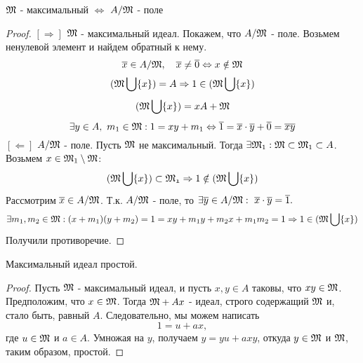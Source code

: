 \begin{thm}
$\mathfrak{M}$ - максимальный $\Leftrightarrow$ $A/\mathfrak{M}$ - поле
\end{thm}
\begin{proof}
$[\Rightarrow]$ $\mathfrak{M}$ - максимальный идеал. Покажем, что $A/\mathfrak{M}$ - поле. Возьмем ненулевой элемент и найдем обратный
к нему.
\[\overline{x} \in A/\mathfrak{M},~~~\overline{x} \neq \overline{0} \Leftrightarrow x \notin \mathfrak{M}\]
\[(\mathfrak{M}\bigcup\{x\}) = A \Rightarrow 1 \in (\mathfrak{M}\bigcup\{x\})\]
\[(\mathfrak{M}\bigcup\{x\}) = xA + \mathfrak{M}\]
\[\exists y \in A, ~ m_1 \in \mathfrak{M}: 1 = xy + m_1 \Leftrightarrow \overline{1} = \overline{x}\cdot\overline{y} + \overline{0}
 = \overline{xy}
\]
$[\Leftarrow]$ $A/\mathfrak{M}$ - поле. Пусть $\mathfrak{M}$ не максимальный. Тогда $\exists \mathfrak{M}_1: \mathfrak{M} \subset \mathfrak{M}_1
\subset A$. Возьмем $x \in \mathfrak{M}_1\setminus\mathfrak{M}$:
\[(\mathfrak{M}\bigcup\{x\}) \subset \mathfrak{M_1} \Rightarrow 1 \notin (\mathfrak{M}\bigcup\{x\})\]
Рассмотрим $\overline{x} \in A/\mathfrak{M}$. Т.к. $A/\mathfrak{M}$ - поле, то $\exists \overline{y} \in A/\mathfrak{M}:~
\overline{x}\cdot\overline{y} = \overline{1}.$
\[\exists m_1, m_2 \in \mathfrak{M}: (x + m_1)(y + m_2) = 1 = xy + m_1y + m_2x + m_1m_2 = 1 \Rightarrow 1 \in
(\mathfrak{M}\bigcup\{x\})\]
Получили противоречие.
\end{proof}

\begin{thm}
Максимальный идеал простой.
\end{thm}
\begin{proof}
Пусть $\mathfrak{M}$ - максимальный идеал, и пусть $x, y \in A$ таковы, что $xy \in \mathfrak{M}$. Предположим, что $x \in \mathfrak{M}$.
Тогда $\mathfrak{M} + Ax$ - идеал, строго содержащий $\mathfrak{M}$ и,  стало быть, равный $A$. Следовательно, мы можем написать
\[1 = u + ax,\] где $u \in \mathfrak{M}$ и $a \in A$. Умножая на $y$, получаем $y = yu + axy$, откуда $y \in \mathfrak{M}$ и $\mathfrak{M}$,
таким образом, простой. 
\end{proof}